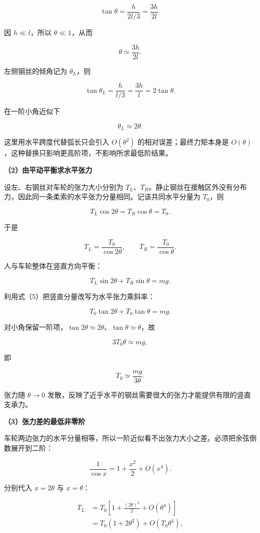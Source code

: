 \documentclass[12pt,a4paper,UTF8]{ctexart}
\begin{document}
\[
\tan\theta=\frac{h}{2l/3}=\frac{3h}{2l}.
\]

因 \(h\ll l\)，所以 \(\theta\ll1\)，从而

\[
\boxed{\theta\simeq\frac{3h}{2l}}.
\tag{2}
\]

左侧钢丝的倾角记为 \(\theta_L\)，则

\[
\tan\theta_L=\frac{h}{l/3}=\frac{3h}{l}
=2\tan\theta.
\]

在一阶小角近似下

\[
\boxed{\theta_L\simeq2\theta}.
\tag{3}
\]

这里用水平跨度代替弧长只会引入 \(O(\theta^2)\)
的相对误差；最终力矩本身是
\(O(\theta)\)，这种替换只影响更高阶项，不影响所求最低阶结果。

\textbf{（2）由平动平衡求水平张力}

设左、右钢丝对车轮的张力大小分别为
\(T_L\)、\(T_R\)。静止钢丝在接触区外没有分布力，因此同一条柔索的水平张力分量相同。记该共同水平分量为
\(T_0\)，则

\[
T_L\cos2\theta=T_R\cos\theta=T_0.
\tag{4}
\]

于是

\[
T_L=\frac{T_0}{\cos2\theta},
\qquad
T_R=\frac{T_0}{\cos\theta}.
\tag{5}
\]

人与车轮整体在竖直方向平衡：

\[
T_L\sin2\theta+T_R\sin\theta=mg.
\]

利用式（5）把竖直分量改写为水平张力乘斜率：

\[
T_0\tan2\theta+T_0\tan\theta=mg.
\tag{6}
\]

对小角保留一阶项，\(\tan2\theta\simeq2\theta\)、\(\tan\theta\simeq\theta\)，故

\[
3T_0\theta\simeq mg,
\]

即

\[
\boxed{T_0\simeq\frac{mg}{3\theta}}.
\tag{7}
\]

张力随 \(\theta\to0\)
发散，反映了近乎水平的钢丝需要很大的张力才能提供有限的竖直支承力。

\textbf{（3）张力差的最低非零阶}

车轮两边张力的水平分量相等，所以一阶近似看不出张力大小之差。必须把余弦倒数展开到二阶：

\[
\frac1{\cos x}=1+\frac{x^2}{2}+O(x^4).
\tag{8}
\]

分别代入 \(x=2\theta\) 与 \(x=\theta\)：

\[
\begin{aligned}
T_L
&=T_0\left[1+\frac{(2\theta)^2}{2}+O(\theta^4)\right]\\
&=T_0\left(1+2\theta^2\right)+O(T_0\theta^4),
\end{aligned}
\tag{9}
\]
\end{document}
